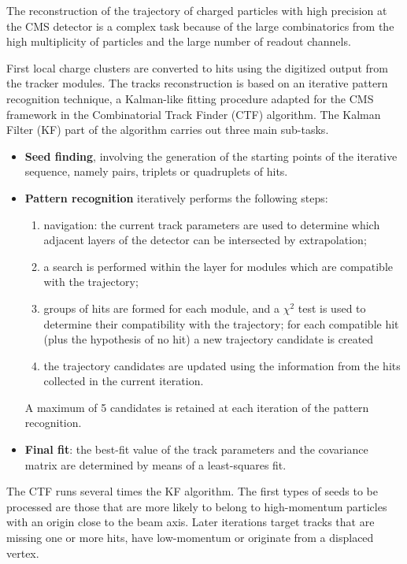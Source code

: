 The reconstruction of the trajectory of charged particles with high precision at the CMS detector
is a complex task because of the large combinatorics from the high multiplicity of particles and the large number of readout channels.

First local charge clusters are converted to hits using the digitized output from the tracker modules.
The tracks reconstruction is based on an iterative pattern recognition technique,
a Kalman-like fitting procedure adapted for the CMS framework in the Combinatorial Track Finder \cite{billoir.qian:simultaneous, Speer:2005dp} (CTF) algorithm.
The Kalman Filter (KF) part of the algorithm carries out three main sub-tasks.
\begin{itemize}
\item \textbf{Seed finding}, involving the generation of the starting points of the iterative sequence, namely pairs, triplets or quadruplets of hits.
\item \textbf{Pattern recognition} iteratively performs the following steps:
  \begin{enumerate}
  \item navigation: the current track parameters are used to determine which adjacent layers of the detector can be intersected by extrapolation;
  \item a search is performed within the layer for modules which are compatible with the trajectory;
  \item groups of hits are formed for each module, and a $\chi^2$ test is used to determine their compatibility with the trajectory;
    for each compatible hit (plus the hypothesis of no hit) a new trajectory candidate is created
  \item the trajectory candidates are updated using the information from the hits collected in the current iteration.
  \end{enumerate}
  A maximum of 5 candidates is retained at each iteration of the pattern recognition.
\item \textbf{Final fit}: the best-fit value of the track parameters and the covariance matrix are determined by means of a least-squares fit.
\end{itemize}
The CTF runs several times the KF algorithm.
The first types of seeds to be processed are those that are more likely to belong to high-momentum particles with an origin close to the beam axis.
Later iterations target tracks that are missing one or more hits, have low-momentum or originate from a displaced vertex.

